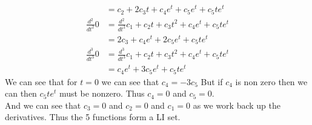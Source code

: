 \documentclass[answers,12pt,addpoints]{exam}
\begin{document}
\begin{questions}
\begin{solution}
\begin{align*}
            &= c_2 + 2c_3t + c_4e^t + c_5e^t + c_5te^t\\
            \frac{d^2}{dt^2} 0 &= \frac{d^2}{dt^2} c_1 + c_2t + c_3t^2 + c_4e^t + c_5te^t\\
            &= 2c_3 + c_4e^t + 2c_5e^t + c_5te^t\\
            \frac{d^3}{dt^3} 0 &= \frac{d^3}{dt^3} c_1 + c_2t + c_3t^2 + c_4e^t + c_5te^t\\
            &= c_4 e^t + 3c_5e^t + c_5te^t
        \end{align*}
        We can see that for $t=0$ we can see that $c_4 = -3c_5$
        But if $c_4$ is non zero then we can then $c_5te^t$ must be nonzero. Thus $c_4 = 0$ and $c_5 = 0$.\\
        And we can see that $c_3 = 0$ and $c_2 = 0$ and $c_1 = 0$ as we work back up the derivatives. Thus the 5 functions form a LI set.
    \end{solution} 


\end{questions}
\end{document}
